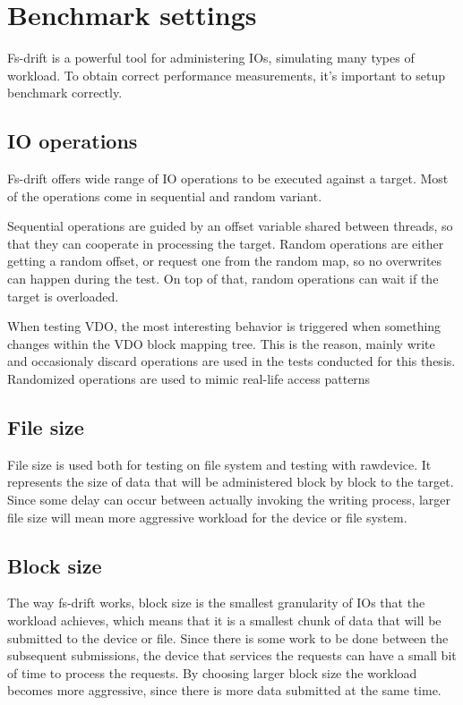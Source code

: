 \documentclass[
  color, %
  table, %
  lof,   %
  lot,   %
]{fithesis3}
\begin{document}
\clearpage


\section{Benchmark settings}
Fs-drift is a powerful tool for administering IOs, simulating many types of workload. To obtain correct performance measurements, it's important to setup benchmark correctly.

\subsection{IO operations}
Fs-drift offers wide range of IO operations to be executed against a target. Most of the operations come in sequential and random variant.

Sequential operations are guided by an offset variable shared between threads, so that they can cooperate in processing the target. Random operations are either getting a random offset, or request one from the random map, so no overwrites can happen during the test. On top of that, random operations can wait if the target is overloaded.

When testing VDO, the most interesting behavior is triggered when something changes within the VDO block mapping tree. This is the reason, mainly write and occasionaly discard operations are used in the tests conducted for this thesis. Randomized operations are used to mimic real-life access patterns

\subsection{File size}
File size is used both for testing on file system and testing with rawdevice. It represents the size of data that will be administered block by block to the target. Since some delay can occur between actually invoking the writing process, larger file size will mean more aggressive workload for the device or file system. 

\subsection{Block size}
The way fs-drift works, block size is the smallest granularity of IOs that the workload achieves, which means that it is a smallest chunk of data that will be submitted to the device or file. Since there is some work to be done between the subsequent submissions, the device that services the requests can have a small bit of time to process the requests. By choosing larger block size the workload becomes more aggressive, since there is more data submitted at the same time.
\end{document}

